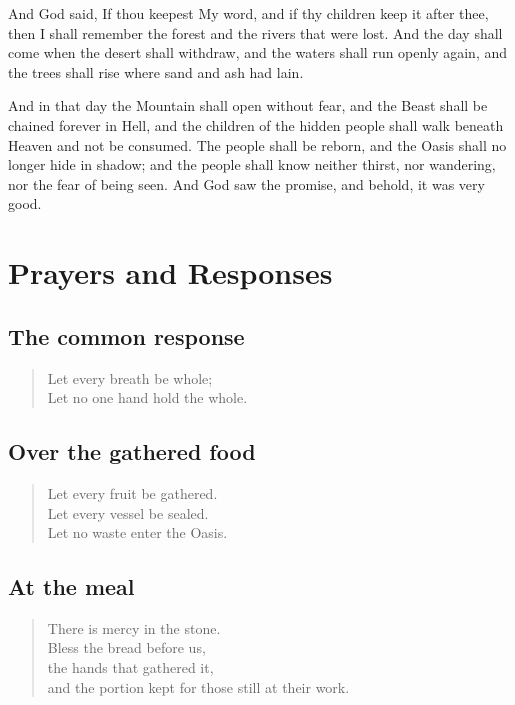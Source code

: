 And God said, If thou keepest My word, and if thy children keep it after thee, then I shall remember the forest and the rivers that were lost. And the day shall come when the desert shall withdraw, and the waters shall run openly again, and the trees shall rise where sand and ash had lain.

And in that day the Mountain shall open without fear, and the Beast shall be chained forever in Hell, and the children of the hidden people shall walk beneath Heaven and not be consumed. The people shall be reborn, and the Oasis shall no longer hide in shadow; and the people shall know neither thirst, nor wandering, nor the fear of being seen. And God saw the promise, and behold, it was very good.

\section*{Prayers and Responses}


\subsection*{The common response}

\begin{verse}
Let every breath be whole;\\
Let no one hand hold the whole.
\end{verse}

\subsection*{Over the gathered food}

\begin{verse}
Let every fruit be gathered.\\
Let every vessel be sealed.\\
Let no waste enter the Oasis.
\end{verse}

\subsection*{At the meal}

\begin{verse}
There is mercy in the stone.\\
Bless the bread before us,\\
the hands that gathered it,\\
and the portion kept for those still at their work.
\end{verse}

